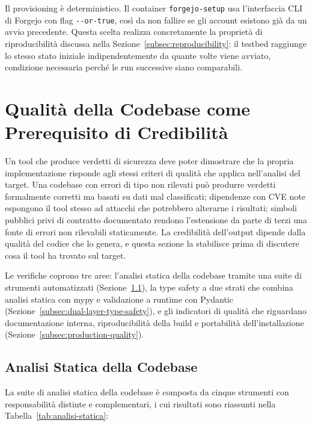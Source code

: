 Il provisioning è deterministico. Il container \texttt{forgejo-setup} usa l'interfaccia \gls{CLI} di Forgejo con flag \texttt{-{}-or-true}, così da non fallire se gli account esistono già da un avvio precedente.
Questa scelta realizza concretamente la proprietà di riproducibilità discussa nella Sezione~\ref{subsec:reproducibility}: il testbed raggiunge lo stesso stato iniziale indipendentemente da quante volte viene avviato, condizione necessaria perché le run successive siano comparabili.




\section{Qualità della Codebase come Prerequisito di Credibilità}%
\label{sec:release-readiness}

Un tool che produce verdetti di sicurezza deve poter dimostrare che la propria implementazione risponde agli stessi criteri di qualità che applica nell'analisi del target. Una codebase con errori di tipo non rilevati può produrre verdetti formalmente corretti ma basati su dati mal classificati; dipendenze con \gls{CVE} note espongono il tool stesso ad attacchi che potrebbero alterarne i risultati; simboli pubblici privi di contratto documentato rendono l'estensione da parte di terzi una fonte di errori non rilevabili staticamente. La credibilità dell'output dipende dalla qualità del codice che lo genera, e questa sezione la stabilisce prima di discutere cosa il tool ha trovato sul target.

Le verifiche coprono tre aree: l'analisi statica della codebase tramite una suite di strumenti automatizzati (Sezione~\ref{subsec:static-analysis}), la type safety a due strati che combina analisi statica con mypy e validazione a runtime con Pydantic (Sezione~\ref{subsec:dual-layer-type-safety}), e gli indicatori di qualità che riguardano documentazione interna, riproducibilità della build e portabilità dell'installazione (Sezione~\ref{subsec:production-quality}).

\subsection{Analisi Statica della Codebase}\label{subsec:static-analysis}

La suite di analisi statica della codebase è composta da cinque strumenti con responsabilità distinte e complementari, i cui risultati sono riassunti nella Tabella~\ref{tab:analisi-statica}:

